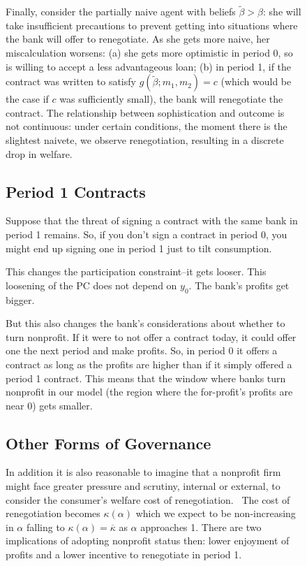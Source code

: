 \documentclass[11pt]{article}%
\begin{document}
\begin{figure}
{Finally, consider the partially naive agent with beliefs $\tilde{\beta}>\beta
$: she will take insufficient precautions to prevent getting into situations
where the bank will offer to renegotiate. As she gets more naive, her
miscalculation worsens: (a) she gets more optimistic in period 0, so is
willing to accept a less advantageous loan; (b) in period 1, if the contract
was written to satisfy $g\left(  \tilde{\beta};m_{1},m_{2}\right)  =c$ (which
would be the case if $c$ was sufficiently small), the bank will renegotiate
the contract. The relationship between sophistication and outcome is not
continuous: under certain conditions, the moment there is the slightest
naivete, we observe renegotiation, resulting in a discrete drop in welfare.

\subsection{Period 1 Contracts}

Suppose that the threat of signing a contract with the same bank in period 1
remains. So, if you don't sign a contract in period 0, you might end up
signing one in period 1 just to tilt consumption.

This changes the participation constraint--it gets looser. This loosening of
the PC does not depend on $y_{0}$. The bank's profits get bigger.

But this also changes the bank's considerations about whether to turn
nonprofit. If it were to not offer a contract today, it could offer one the
next period and make profits. So, in period 0 it offers a contract as long as
the profits are higher than if it simply offered a period 1 contract. This
means that the window where banks turn nonprofit in our model (the region
where the for-profit's profits are near 0) gets smaller.

\subsection{Other Forms of Governance}

In addition it is also reasonable to imagine that a nonprofit firm might face
greater pressure and scrutiny, internal or external, to consider the
consumer's welfare cost of renegotiation. \ The cost of renegotiation becomes
$\kappa(\alpha)$ which we expect to be non-increasing in $\alpha$ falling to
$\kappa(\alpha)=\overline{\kappa}$ as $\alpha$ approaches 1. There are two
implications of adopting nonprofit status then: lower enjoyment of profits and
a lower incentive to renegotiate in period 1.

}
\end{figure}
\end{document}
